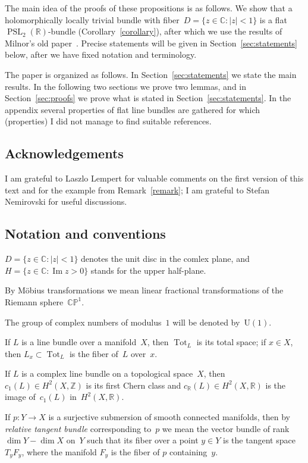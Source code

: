 \documentclass[11pt]{amsart}
\newcommand*{\C}{{\mathbb C}}
\newcommand*{\CP}{{\mathbb {CP}}}
\newcommand*{\R}{{\mathbb R}}
\newcommand*{\Z}{{\mathbb Z}}
\DeclareMathOperator{\PSL}{PSL}
\DeclareMathOperator{\Tot}{Tot}
\def\Im{\mathop{\mathrm{Im}}\nolimits}
\theoremstyle{remark}
\theoremstyle{definition}
\begin{document}
The main idea of the proofs of these propositions is as follows. We
show that a holomorphically locally trivial bundle with
fiber~$D=\{z\in\C\colon |z|<1\}$ is a flat $\PSL_2(\R)$-bundle
(Corollary~\ref{corollary}), after which we use the results of
Milnor's old paper~\cite{Milnor}.  Precise statements will be given in
Section~\ref{sec:statements} below, after we have fixed notation and
terminology.

The paper is organized as follows. In Section~\ref{sec:statements} we
state the main results. In the following two sections we prove two
lemmas, and in Section~\ref{sec:proofs} we prove what is stated in
Section~\ref{sec:statements}. In the appendix several properties of
flat line bundles are gathered for which (properties) I did not manage
to find suitable references.

\subsection*{Acknowledgements}

I am grateful to Laszlo Lempert for valuable comments on the first
version of this text and for the example from Remark~\ref{remark}; I
am grateful to Stefan Nemirovski for useful discussions.

\subsection{Notation and conventions}

$D=\{z\in\C\colon |z|<1\}$ denotes the unit disc in the comlex plane,
and $H=\{z\in\C\colon \Im z>0\}$ stands for the upper half-plane.

By M\"obius transformations we mean linear fractional transformations
of the Riemann sphere~$\CP^1$.

The group of complex numbers of modulus~$1$ will be denoted
by~$\mathrm U(1)$. 

If $L$ is a line bundle over a manifold~$X$, then $\Tot_L$ is its
total space; if $x\in X$, then $L_x\subset\Tot_L$ is the fiber of~$L$
over~$x$. 

If $L$ is a complex line bundle on a topological space~$X$, then
$c_1(L)\in H^2(X,\Z)$ is its first Chern class and
$c_\R(L)\in H^2(X,\R)$ is the image of~$c_1(L)$ in~$H^2(X,\R)$.

If $p\colon Y\to X$ is a surjective submersion of smooth connected manifolds, then by \emph{relative tangent bundle} corresponding
to~$p$ we mean the vector bundle of rank $\dim Y-\dim X$ on~$Y$ such
that its fiber over a point $y\in Y$ is the tangent space $T_yF_y$,
where the manifold $F_y$ is the fiber of $p$ containing~$y$.
\end{document}

